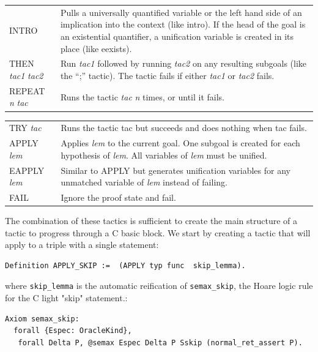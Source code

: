 \documentclass{puthesis}
\begin{document}
\vspace{5mm}

\noindent \begin{tabular}{l@{\quad\quad}p{90mm}}
{\sf INTRO} & Pulls a universally quantified variable or the left hand
side of an
implication into the context (like {\sf intro}). If the head of the goal is an existential
quantifier, a unification variable is created in its place (like {\sf
  eexists}). \\
{\sf THEN} {\it tac1} {\it tac2} & Run {\it tac1} followed by running {\it
  tac2} on any resulting subgoals (like the ``{\sf ;}'' tactic). The tactic fails if either 
  {\it tac1} or {\it tac2} fails.\\
{\sf REPEAT} {\it n} {\it tac} & Runs the tactic {\it tac} {\it n}
times, or until it fails. \\
\end{tabular}

\noindent \begin{tabular}{l@{\quad\quad}p{90mm}}
{\sf TRY} {\it tac} & Runs the tactic {\sf tac} but succeeds and does
nothing when {\sf tac} fails.\\
{\sf APPLY} {\it lem} & Applies {\it lem} to the current goal. One
subgoal is created for each hypothesis of {\it lem}. All variables of
{\it lem} must be unified.\\
{\sf EAPPLY} {\it lem} & Similar to {\sf APPLY} but generates
unification variables for any unmatched variable of {\it lem} instead
of failing. \\
{\sf FAIL} & Ignore the proof state and fail. \\ 
\end{tabular}

The combination of these tactics is sufficient to create the main
structure of a tactic to progress through a C basic block. We start by
creating a tactic that will apply to a triple with a single statement:

\begin{lstlisting}
Definition APPLY_SKIP :=  (APPLY typ func  skip_lemma).
\end{lstlisting}
where \lstinline|skip_lemma| is the automatic reification of
\lstinline|semax_skip|, the Hoare logic rule for the C light "skip" statement.:

\begin{lstlisting}
Axiom semax_skip:
  forall {Espec: OracleKind},
   forall Delta P, @semax Espec Delta P Sskip (normal_ret_assert P).
\end{lstlisting}
\end{document}
